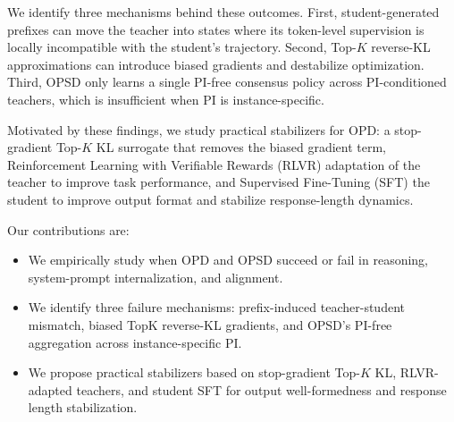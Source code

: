 We identify three mechanisms behind these outcomes. First, student-generated
prefixes can move the teacher into states where its token-level supervision is
locally incompatible with the student's trajectory. Second, Top-$K$ reverse-KL
approximations can introduce biased gradients and destabilize optimization. Third, OPSD only learns a single PI-free consensus policy across PI-conditioned teachers, which is insufficient when PI is instance-specific.

Motivated by these findings, we study practical stabilizers for OPD: a
stop-gradient Top-$K$ KL surrogate that removes the biased gradient term, Reinforcement Learning with Verifiable Rewards (RLVR)
adaptation of the teacher to improve task performance, and Supervised Fine-Tuning (SFT) the student to improve output format and stabilize response-length dynamics.

Our contributions are:
\begin{itemize}
    \item We empirically study when OPD and OPSD succeed or fail in reasoning, system-prompt internalization, and alignment. \item We identify three failure mechanisms: prefix-induced teacher-student mismatch, biased TopK reverse-KL gradients, and OPSD's PI-free aggregation across instance-specific PI. 
    \item We propose practical stabilizers based on stop-gradient Top-$K$ KL,
    RLVR-adapted teachers, and student SFT for output well-formedness
    and response length stabilization.
\end{itemize}


